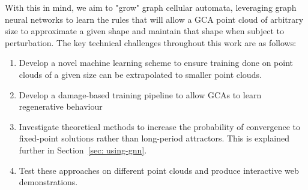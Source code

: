 With this in mind, we aim to "grow" graph cellular automata, leveraging graph neural networks to learn the rules that will allow a GCA point cloud of arbitrary size to approximate a given shape and maintain that shape when subject to perturbation. The key technical challenges throughout this work are as follows:

\begin{enumerate}
    \item Develop a novel machine learning scheme to ensure training done on point clouds of a given size can be extrapolated to smaller point clouds.
    \item Develop a damage-based training pipeline to allow GCAs to learn regenerative behaviour
    \item Investigate theoretical methods to increase the probability of convergence to fixed-point solutions rather than long-period attractors. This is explained further in Section~\ref{sec: using-gnn}.
    \item Test these approaches on different point clouds and produce interactive web demonstrations.
\end{enumerate}
